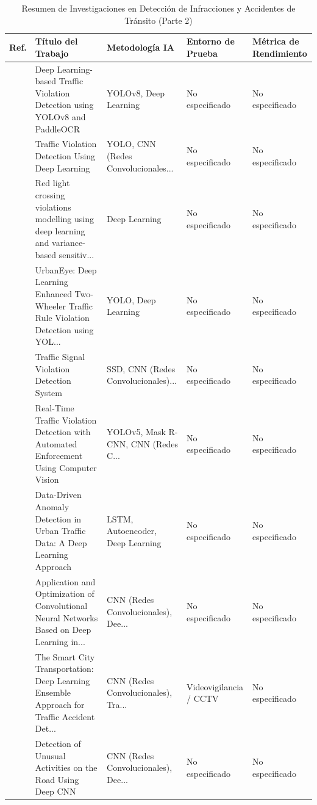 \begin{table}[htbp]
\centering
\renewcommand{\arraystretch}{1.1}
\caption{Resumen de Investigaciones en Detección de Infracciones y Accidentes de Tránsito (Parte 2)}
\label{tab:articulos_transporte_2}
\footnotesize
\begin{tabular}{cp{7.5cm}p{2.8cm}p{2.8cm}p{2.8cm}}
\toprule
\textbf{Ref.} & \textbf{Título del Trabajo} & \textbf{Metodología IA} & \textbf{Entorno de Prueba} & \textbf{Métrica de Rendimiento} \\
\midrule
\cite{bhaskara2025deep} & Deep Learning-based Traffic Violation Detection using YOLOv8 and PaddleOCR & YOLOv8, Deep Learning & No especificado & No especificado \\
\cite{suresh2025traffic} & Traffic Violation Detection Using Deep Learning & YOLO, CNN (Redes Convolucionales... & No especificado & No especificado \\
\cite{owais2025light} & Red light crossing violations modelling using deep learning and variance-based sensitiv... & Deep Learning & No especificado & No especificado \\
\cite{gowroju2025urbaneye} & UrbanEye: Deep Learning Enhanced Two-Wheeler Traffic Rule Violation Detection using YOL... & YOLO, Deep Learning & No especificado & No especificado \\
\cite{pujitha2025traffic} & Traffic Signal Violation Detection System & SSD, CNN (Redes Convolucionales)... & No especificado & No especificado \\
\cite{balasaranya2025realtime} & Real-Time Traffic Violation Detection with Automated Enforcement Using Computer Vision & YOLOv5, Mask R-CNN, CNN (Redes C... & No especificado & No especificado \\
\cite{ijaradar2025datadriven} & Data-Driven Anomaly Detection in Urban Traffic Data: A Deep Learning Approach & LSTM, Autoencoder, Deep Learning & No especificado & No especificado \\
\cite{wang2025application} & Application and Optimization of Convolutional Neural Networks Based on Deep Learning in... & CNN (Redes Convolucionales), Dee... & No especificado & No especificado \\
\cite{kumar2025smart} & The Smart City Transportation: Deep Learning Ensemble Approach for Traffic Accident Det... & CNN (Redes Convolucionales), Tra... & Videovigilancia / CCTV & No especificado \\
\cite{kalwa2025unusual} & Detection of Unusual Activities on the Road Using Deep CNN & CNN (Redes Convolucionales), Dee... & No especificado & No especificado \\

\end{tabular}
\end{table}

